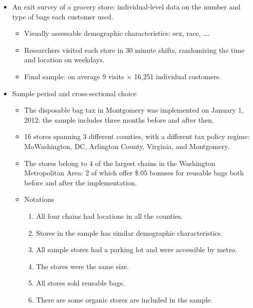 \documentclass[../root]{subfiles}
\begin{document}
    \begin{itemize}
      \item An exit survey of a grocery store: individual-level data on the number and type of bags each customer used.
      \begin{itemize}
        \item Visually assessable demographic characteristics: sex, race, \ldots.
        \item Researchers visited each store in 30 minute shifts, randomizing the time and location on weekdays.
        \item Final sample: on average 9 visits $\times$ 16,251 individual customers.
      \end{itemize}
      \item Sample period and cross-sectional choice
      \begin{itemize}
        \item The disposable bag tax in Montgomery was implemented on January 1, 2012: the sample includes three months before and after then.
        \item 16 stores spanning 3 different counties, with a different tax policy regime: MoWashington, DC, Arlington County, Virginia, and Montgomery.
        \item The stores belong to 4 of the largest chains in the Washington Metropolitan Area: 2 of which offer \$.05 bonuses for reusable bags both before and after the implementation.
        \item Notations
        \begin{enumerate}
          \item All four chains had locations in all the counties.
          \item Stores in the sample has similar demographic characteristics.
          \item All sample stores had a parking lot and were accessible by metro.
          \item The stores were the same size.
          \item All stores sold reusable bags.
          \item There are some organic stores are included in the sample.
        \end{enumerate}
      \end{itemize}
    \end{itemize}
\end{document}
